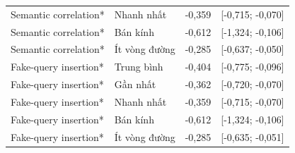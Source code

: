 \begin{longtable}{@{}P{3.5cm}P{2.4cm}P{4.628cm}P{4.628cm}@{}}
Semantic correlation* & Nhanh nhất & -0{,}359 & [-0{,}715; -0{,}070] \\
Semantic correlation* & Bán kính & -0{,}612 & [-1{,}324; -0{,}106] \\
Semantic correlation* & Ít vòng đường & -0{,}285 & [-0{,}637; -0{,}050] \\
Fake-query insertion* & Trung bình & -0{,}404 & [-0{,}775; -0{,}096] \\
Fake-query insertion* & Gần nhất & -0{,}362 & [-0{,}720; -0{,}070] \\
Fake-query insertion* & Nhanh nhất & -0{,}359 & [-0{,}715; -0{,}070] \\
Fake-query insertion* & Bán kính & -0{,}612 & [-1{,}324; -0{,}106] \\
Fake-query insertion* & Ít vòng đường & -0{,}285 & [-0{,}635; -0{,}051] \\
\end{longtable}\endgroup\par
